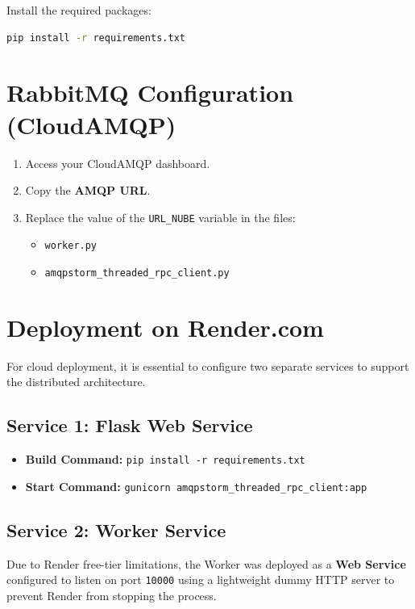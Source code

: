 \documentclass[12pt,a4paper]{article}
\begin{document}
Install the required packages:

\begin{lstlisting}[language=bash]
pip install -r requirements.txt
\end{lstlisting}

\section{RabbitMQ Configuration (CloudAMQP)}

\begin{enumerate}
    \item Access your CloudAMQP dashboard.
    \item Copy the \textbf{AMQP URL}.
    \item Replace the value of the \texttt{URL\_NUBE} variable in the files:
    \begin{itemize}
        \item \texttt{worker.py}
        \item \texttt{amqpstorm\_threaded\_rpc\_client.py}
    \end{itemize}
\end{enumerate}

\section{Deployment on Render.com}

For cloud deployment, it is essential to configure two separate services to support the distributed architecture.

\subsection{Service 1: Flask Web Service}

\begin{itemize}
    \item \textbf{Build Command:} \texttt{pip install -r requirements.txt}
    \item \textbf{Start Command:} \texttt{gunicorn amqpstorm\_threaded\_rpc\_client:app}
\end{itemize}

\subsection{Service 2: Worker Service}

Due to Render free-tier limitations, the Worker was deployed as a \textbf{Web Service} configured to listen on port \texttt{10000} using a lightweight dummy HTTP server to prevent Render from stopping the process.
\end{document}
